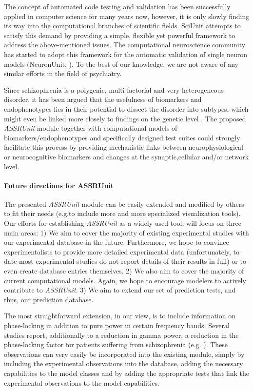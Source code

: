 \documentclass[a4paper,10pt]{article}
\begin{document}
The concept of automated code testing and validation has been successfully applied in computer science for many years now, however, it is only slowly finding its way into the computational 
branches of scientific fields. SciUnit attempts to satisfy this demand by providing a simple, flexible yet powerful framework to address the above-mentioned issues. The computational neuroscience 
community has started to adopt this framework for the automatic validation of single neuron models (NeuronUnit, \cite{Gerkin2014}). 
To the best of our knowledge, we are not aware of any similar efforts in the field of psychiatry.

Since schizophrenia is a polygenic, multi-factorial and very heterogeneous disorder, it has been argued that the usefulness of biomarkers and endophenotypes lies in their potential to
dissect the disorder into subtypes, which might even be linked more closely to findings on the genetic level \cite{Meyer2006,Perlis2011,Markou2009}. The proposed \textit{ASSRUnit} module together with computational models of 
biomarkers/endophenotypes and specifically designed test suites could strongly facilitate this process by providing mechanistic links between neurophysiological or neurocognitive biomarkers
and changes at the synaptic,cellular and/or network level.


\paragraph{Future directions for ASSRUnit}
The presented \textit{ASSRUnit} module can be easily extended and modified by others to fit their needs (e.g.to include  more and more specialized visualization tools). Our efforts
for establishing \textit{ASSRUnit} as a widely used tool, will focus on three main areas: 1) We aim to cover the majority of existing experimental studies with our experimental database in the future.
Furthermore, we hope to convince experimentalists to provide more detailed experimental data (unfortunately, to date most experimental studies do not report details of their results in full) or to
even create database entries themselves. 2) We also aim to cover the majority of current computational models. Again, we hope to encourage modelers to actively contribute to \textit{ASSRUnit}.
3) We aim to extend our set of prediction tests, and thus, our prediction database. 

The most straightforward extension, in our view, is to include information on phase-locking in addition to 
pure power in certain frequency bands. 
Several studies report, additionally to a reduction in gamma power, a  reduction in the phase-locking factor for patients suffering from schizophrenia 
(e.g. \cite{Kwon1999,Brenner2003,Light2006,Vierling2008,Krishnan2009}). These observations can very easily be incorporated into the existing module, simply by including the experimental observations into the database,
adding the necessary capabilities to the model classes and by adding the appropriate tests that link the experimental observations to the model capabilities.
\end{document}
